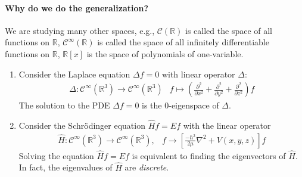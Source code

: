 \paragraph{Why do we do the generalization?}
We are studying many other spaces, e.g., $\mathcal{C}(\mathbb{R})$ is called the space of all functions on $\mathbb{R}$, $\mathcal{C}^\infty(\mathbb{R})$ is called the space of all infinitely differentiable functions on $\mathbb{R}$, $\mathbb{R}[x]$ is the space of polynomials of one-variable.
\begin{example}
\begin{enumerate}
\item
Consider the Laplace equation $\Delta f=0$ with linear operator $\Delta$:
\[
\begin{array}{ll}
\Delta:\mathcal{C}^\infty(\mathbb{R}^3)\to\mathcal{C}^\infty(\mathbb{R}^3)
&
f\mapsto(\frac{\partial^2}{\partial x^2}+\frac{\partial^2}{\partial y^2}+\frac{\partial^2}{\partial z^2})f
\end{array}
\]
The solution to the PDE $\Delta f=0$ is the 0-eigenspace of $\Delta$.
\item
Consider the Schrödinger equation
$
\hat Hf = Ef
$
with the linear operator 
\[
\begin{array}{ll}
\hat H:\mathcal{C}^\infty(\mathbb{R}^3)\to\mathcal{C}^\infty(\mathbb{R}^3),
&
f\to
\left[{\frac
 {-\hbar ^{2}}{2\mu }}\nabla ^{2}+V(x,y,z )\right]f
\end{array}
\]
Solving the equation $\hat Hf=Ef$ is equivalent to finding the eigenvectors of $\hat H$. In fact, the eigenvalues of $\hat H$ are \emph{discrete}.
\end{enumerate}
\end{example}

